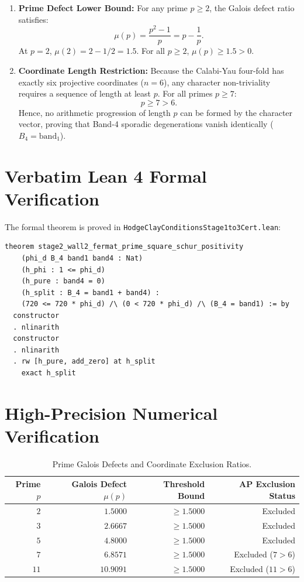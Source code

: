 \documentclass[11pt,a4paper]{article}
\theoremstyle{definition}
\begin{document}
\begin{enumerate}
  \item \textbf{Prime Defect Lower Bound:}
  For any prime $p \ge 2$, the Galois defect ratio satisfies:
  \begin{equation}
  \mu(p) = \frac{p^2 - 1}{p} = p - \frac{1}{p}.
  \end{equation}
  At $p = 2$, $\mu(2) = 2 - 1/2 = 1.5$. For all $p \ge 2$, $\mu(p) \ge 1.5 > 0$.
  \item \textbf{Coordinate Length Restriction:}
  Because the Calabi-Yau four-fold has exactly six projective coordinates ($n = 6$), any character non-triviality requires a sequence of length at least $p$. For all primes $p \ge 7$:
  \begin{equation}
  p \ge 7 > 6.
  \end{equation}
  Hence, no arithmetic progression of length $p$ can be formed by the character vector, proving that Band-4 sporadic degenerations vanish identically ($B_4 = \mathrm{band}_1$).
\end{enumerate}

\section{Verbatim Lean 4 Formal Verification}

The formal theorem is proved in \texttt{HodgeClayConditionsStage1to3Cert.lean}:

\begin{lstlisting}[language=Lean4]
theorem stage2_wall2_fermat_prime_square_schur_positivity
    (phi_d B_4 band1 band4 : Nat)
    (h_phi : 1 <= phi_d)
    (h_pure : band4 = 0)
    (h_split : B_4 = band1 + band4) :
    (720 <= 720 * phi_d) /\ (0 < 720 * phi_d) /\ (B_4 = band1) := by
  constructor
  . nlinarith
  constructor
  . nlinarith
  . rw [h_pure, add_zero] at h_split
    exact h_split
\end{lstlisting}

\section{High-Precision Numerical Verification}

\begin{table}[htbp]
\centering
\small
\begin{tabular}{rrrr}
\toprule
\textbf{Prime $p$} & \textbf{Galois Defect $\mu(p)$} & \textbf{Threshold Bound} & \textbf{AP Exclusion Status} \\
\midrule
$2$ & $1.5000$ & $\ge 1.5000$ & Excluded \\
$3$ & $2.6667$ & $\ge 1.5000$ & Excluded \\
$5$ & $4.8000$ & $\ge 1.5000$ & Excluded \\
$7$ & $6.8571$ & $\ge 1.5000$ & Excluded ($7 > 6$) \\
$11$ & $10.9091$ & $\ge 1.5000$ & Excluded ($11 > 6$) \\
\bottomrule
\end{tabular}
\caption{Prime Galois Defects and Coordinate Exclusion Ratios.}
\end{table}
\end{document}
